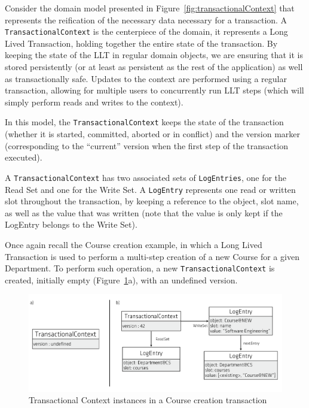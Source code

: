 \documentclass{llncs}
\begin{document}
Consider the domain model presented in
Figure~\ref{fig:transactionalContext} that represents the reification
of the necessary data necessary for a transaction. A
\texttt{TransactionalContext} is the centerpiece of the domain, it
represents a Long Lived Transaction, holding together the entire state
of the transaction. By keeping the state of the LLT in regular domain
objects, we are ensuring that it is stored persistently (or at least
as persistent as the rest of the application) as well as
transactionally safe. Updates to the context are performed using a
regular transaction, allowing for multiple users to concurrently run
LLT steps (which will simply perform reads and writes to the context).

In this model, the \texttt{TransactionalContext} keeps the state of
the transaction (whether it is started, committed, aborted or in
conflict) and the version marker (corresponding to the ``current''
version when the first step of the transaction executed).

A \texttt{TransactionalContext} has two associated sets of
\texttt{LogEntries}, one for the Read Set and one for the Write Set. A
\texttt{LogEntry} represents one read or written slot throughout the
transaction, by keeping a reference to the object, slot name, as well
as the value that was written (note that the value is only kept if the
LogEntry belongs to the Write Set).

Once again recall the Course creation example, in which a Long Lived
Transaction is used to perform a multi-step creation of a new Course
for a given Department. To perform such operation, a new
\texttt{TransactionalContext} is created, initially empty
(Figure~\ref{fig:course-logEntries}a), with an undefined version.

\begin{figure}
\centering
\includegraphics[width=1\linewidth]{log-entries}
\caption{Transactional Context instances in a Course creation transaction}
\label{fig:course-logEntries}
\end{figure}
\end{document}
